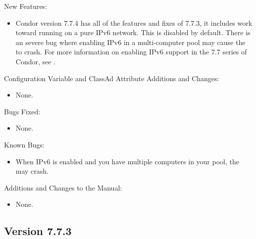 \noindent New Features:

\begin{itemize}

\item Condor version 7.7.4 has all of the features and fixes of 7.7.3, it 
includes work toward running on a pure IPv6 network.  This is disabled by
default.  There is an severe bug where enabling IPv6 in a multi-computer pool
may cause the  to crash.  For 
more information on enabling IPv6 support in the 7.7 series of Condor, see .

\end{itemize}

\noindent Configuration Variable and ClassAd Attribute Additions and Changes:

\begin{itemize}

\item None.

\end{itemize}

\noindent Bugs Fixed:

\begin{itemize}

\item None.

\end{itemize}

\noindent Known Bugs:

\begin{itemize}

\item When IPv6 is enabled and you have multiple computers in your pool, the  may crash.

\end{itemize}

\noindent Additions and Changes to the Manual:

\begin{itemize}

\item None.

\end{itemize}


\subsection*{\label{sec:New-7-7-3}Version 7.7.3}

